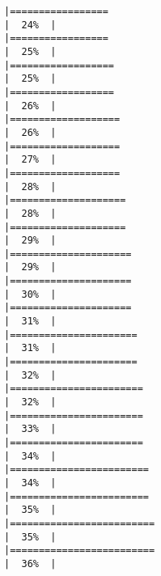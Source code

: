 \documentclass[10pt,letterpaper]{article}
\begin{document}
\begin{verbatim}
|=================                                                     |  24%  |                                                                              |=================                                                     |  25%  |                                                                              |==================                                                    |  25%  |                                                                              |==================                                                    |  26%  |                                                                              |===================                                                   |  26%  |                                                                              |===================                                                   |  27%  |                                                                              |===================                                                   |  28%  |                                                                              |====================                                                  |  28%  |                                                                              |====================                                                  |  29%  |                                                                              |=====================                                                 |  29%  |                                                                              |=====================                                                 |  30%  |                                                                              |=====================                                                 |  31%  |                                                                              |======================                                                |  31%  |                                                                              |======================                                                |  32%  |                                                                              |=======================                                               |  32%  |                                                                              |=======================                                               |  33%  |                                                                              |=======================                                               |  34%  |                                                                              |========================                                              |  34%  |                                                                              |========================                                              |  35%  |                                                                              |=========================                                             |  35%  |                                                                              |=========================                                             |  36%  |                                                                              
\end{verbatim}
\end{document}

